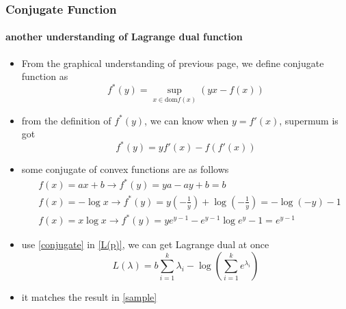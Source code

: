 \begin{frame}
	\frametitle{Conjugate Function}
	\framesubtitle{another understanding of Lagrange dual function}
	\begin{scriptsize}
	\begin{itemize}
		\item From the graphical understanding of previous page, we define conjugate function as
		\begin{equation}
			f^*(y)=\sup_{x\in \text{dom} f(x)}(yx-f(x))
		\end{equation}
		\item from the definition of $f^*(y)$, we can know when $y=f'(x)$, supermum is got 
			\begin{equation}
				f^*(y)=yf'(x)-f(f'(x))
			\end{equation}
   		\item some conjugate of convex functions are as follows
		\begin{equation}\label{conjugate}
			\begin {aligned}
				&f(x)=ax+b \rightarrow f^*(y)=ya-ay+b=b \\
				&f(x)=-\log x \rightarrow f^*(y)=y(-\frac{1}{y})+\log (-\frac{1}{y})=-\log (-y)-1\\
				&f(x)=x\log x \rightarrow f^*(y)=ye^{y-1}-e^{y-1}\log{e^y-1}=e^{y-1}
			\end {aligned}
		\end{equation}
		\item use \ref{conjugate} in \ref{L(p)}, we can get Lagrange dual at once
			\begin{equation}
				L(\lambda)=b\sum_{i=1}^{k}{\lambda_i}-\log(\sum_{i=1}^{k}e^{\lambda_i})
			\end{equation}
		\item it matches the result in \ref{sample} 
	\end{itemize}
	\end{scriptsize}
\end{frame}
